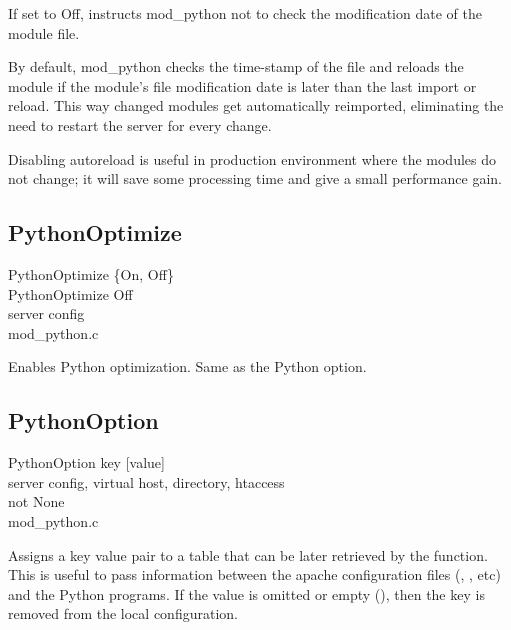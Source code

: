 If set to Off, instructs mod_python not to check the modification date
of the module file. 

By default, mod_python checks the time-stamp of the file and reloads
the module if the module's file modification date is later than the
last import or reload. This way changed modules get automatically
reimported, eliminating the need to restart the server for every
change.

Disabling autoreload is useful in production environment where the
modules do not change; it will save some processing time and give a
small performance gain.

\subsection{PythonOptimize\label{dir-other-pomz}}

PythonOptimize \{On, Off\} \\
PythonOptimize Off\\
server config\\
mod_python.c

Enables Python optimization. Same as the Python  option.

\subsection{PythonOption\label{dir-other-po}}

PythonOption key [value] \\
server config, virtual host, directory, htaccess\\
not None\\
mod_python.c

Assigns a key value pair to a table that can be later retrieved by the
 function. This is useful to pass information
between the apache configuration files (,
, etc) and the Python programs. If the value is omitted or empty (),
then the key is removed from the local configuration.

